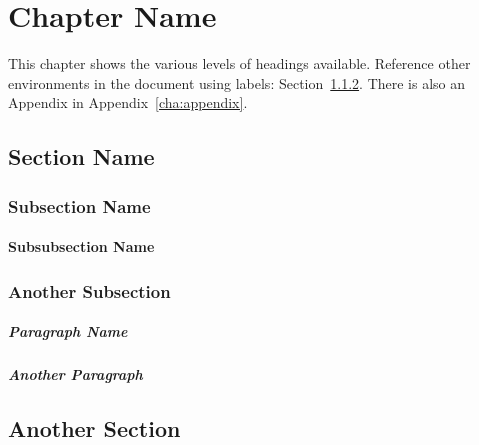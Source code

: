 \chapter{Chapter Name} %
\label{cha:chapter_name}

This chapter shows the various levels of headings available. Reference other environments in the document using labels: Section~\ref{sub:another_subsection}. There is also an Appendix in Appendix~\ref{cha:appendix}.

\section{Section Name} %
\label{sec:section_name}

\blindtext

\subsection{Subsection Name} %
\label{sub:subsection_name}

\blindtext

\subsubsection{Subsubsection Name} %
\label{ssub:subsubsection_name}

\blindtext

\subsection{Another Subsection} %
\label{sub:another_subsection}

\paragraph{Paragraph Name} %
\label{par:paragraph_name}

\blindtext

\paragraph{Another Paragraph} %
\label{par:another_paragraph}

\blindtext

\section{Another Section} %
\label{sec:another_section}

\blindtext
